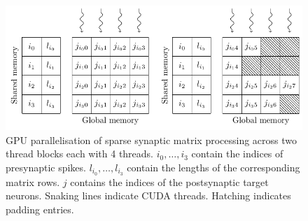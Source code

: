 \documentclass[utf8]{frontiersSCNS} %
\begin{document}

\begin{figure}
    \begin{center}
        \includegraphics{figures/ragged_matrix}
    \end{center}
    \caption{GPU parallelisation of sparse synaptic matrix processing across two thread blocks each with \num{4} threads.
    $i_{0},\ldots,i_{3}$ contain the indices of presynaptic spikes.
    $l_{i_{0}},\ldots,l_{i_{3}}$ contain the lengths of the corresponding matrix rows.
    $j$ contains the indices of the postsynaptic target neurons.
    Snaking lines indicate CUDA threads.
    Hatching indicates padding entries.}
    \label{fig:ragged_matrix}
\end{figure}
\end{document}

